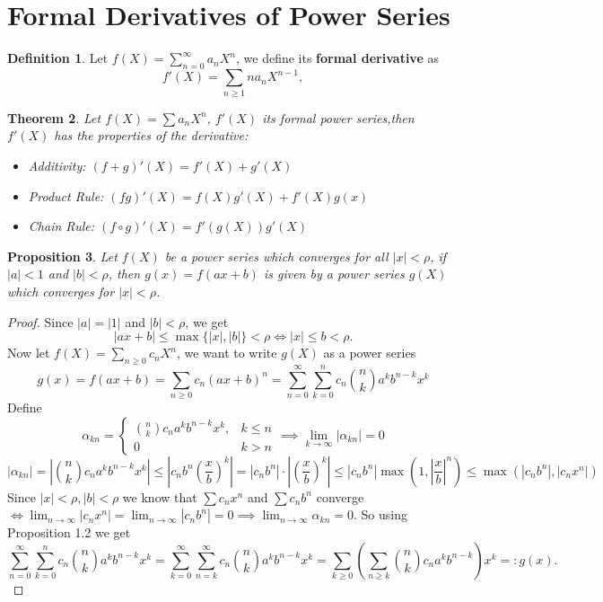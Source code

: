\documentclass[a4paper]{article}
\theoremstyle{plain}
\newtheorem{thm}{Theorem}[section]
\newtheorem{prop}[thm]{Proposition}
\theoremstyle{definition}
\newtheorem{defi}[thm]{Definition}
\begin{document}
\section{Formal Derivatives of Power Series}
\begin{defi}
  Let $f(X) = \sum_{n=0}^{\infty} a_{n}X^{n} $, we define its \textbf{formal derivative} as
  $$f'(X) = \sum_{n\geq 1} na_{n}X^{n-1}, $$
\end{defi}
\begin{thm} Let $f(X) = \sum a_{n}X^{n}$, $f'(X)$ its formal power series,then $f'(X)$ has the properties of the derivative:
  \begin{itemize}
    \item Additivity: $(f+g)'(X) = f'(X) + g'(X)$
    \item Product Rule: $(fg)'(X) = f(X)g'(X) + f'(X)g(x)$
    \item Chain Rule: $(f \circ g)'(X) = f'(g(X))g'(X)$
  \end{itemize}
\end{thm}
\begin{prop} %
Let $f(X)$ be a power series which converges for all $|x| < \rho$, if $|a| < 1$ and $|b| < \rho$, then $g(x) = f(ax+b)$ is given by a power series $g(X)$ which converges for $|x| < \rho$.
\end{prop}
\begin{proof}
  Since $|a| = |1|$ and $|b| < \rho$, we get
  $$|ax + b| \leq \max\{|x|, |b|\} < \rho \iff |x| \leq b < \rho.$$
  Now let $f(X) = \sum_{n \geq 0}c_{n}X^{n}$, we want to write $g(X)$ as a power series
  $$g(x) = f(ax+b) = \sum_{n \geq 0}c_{n}(ax+b)^{n} = \sum_{n = 0}^{\infty} \sum _{k=0}^{n}c_{n}\binom nk a^{k}b^{n-k}x^{k}$$
  Define
  $$\alpha_{kn} = \begin{cases}\binom nk c_{n}a^{k}b^{n-k}x^{k}, & k \leq n \\ 0 & k > n\end{cases} \implies \lim_{k \to \infty}|\alpha_{kn}| = 0$$
  $$|\alpha_{kn}| = \left|\binom nk c_{n}a^{k}b^{n-k}x^{k}\right| \leq \left| c_{n}b^{n} \left(\frac{x}{b}\right)^{k}\right| = \left| c_{n}b^{n}\right| \cdot\left| \left(\frac{x}{b}\right)^{k}\right| \leq |c_{n}b^{n}|\max(1, \left|\frac{x}{b}\right|^{n}) \leq \max(|c_{n}b^{n}|, |c_{n}x^{n}|)$$
  Since $|x| < \rho, |b| < \rho$ we know that $\sum c_{n}x^{n}$ and $\sum c_{n}b^{n}$ converge $\iff \lim_{n \to \infty}|c_{n}x^{n}| = \lim_{n \to \infty}|c_{n}b^{n}| = 0 \implies \lim_{n \to \infty}\alpha_{kn} = 0$. So using Proposition 1.2 we get
$$\sum_{n = 0}^{\infty} \sum _{k=0}^{n}c_{n}\binom nk a^{k}b^{n-k}x^{k} = \sum_{k = 0}^{\infty} \sum _{n=k}^{\infty}c_{n}\binom nk a^{k}b^{n-k}x^{k} = \sum_{k \geq 0}\left( \sum_{n \geq k} \binom nk c_{n}a^{k}b^{n-k}\right)x^{k} =: g(x).$$
\end{proof}
\end{document}
